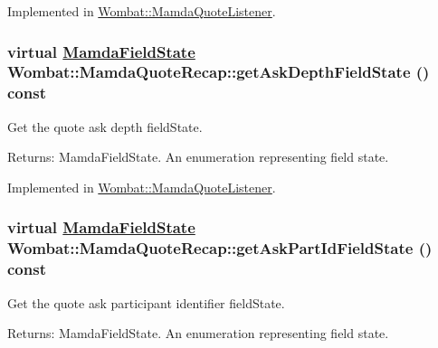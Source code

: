 Implemented in \hyperlink{classWombat_1_1MamdaQuoteListener_4e3d063324f15dacfaf2eec0f7f31e71}{Wombat::Mamda\-Quote\-Listener}.\hypertarget{classWombat_1_1MamdaQuoteRecap_53dd0bc6a2a9ceb6612b2438cc2e9272}{
\subsubsection[getAskDepthFieldState]{\setlength{\rightskip}{0pt plus 5cm}virtual \hyperlink{namespaceWombat_93aac974f2ab713554fd12a1fa3b7d2a}{Mamda\-Field\-State} Wombat::Mamda\-Quote\-Recap::get\-Ask\-Depth\-Field\-State () const}}
\label{classWombat_1_1MamdaQuoteRecap_53dd0bc6a2a9ceb6612b2438cc2e9272}


Get the quote ask depth field\-State. 

\begin{Desc}
\item[Returns:]Mamda\-Field\-State. An enumeration representing field state. \end{Desc}


Implemented in \hyperlink{classWombat_1_1MamdaQuoteListener_f43a394a5e090162a80b749f682ecc38}{Wombat::Mamda\-Quote\-Listener}.\hypertarget{classWombat_1_1MamdaQuoteRecap_3e92b5b825c4ca2701857aee43c1e1e7}{
\subsubsection[getAskPartIdFieldState]{\setlength{\rightskip}{0pt plus 5cm}virtual \hyperlink{namespaceWombat_93aac974f2ab713554fd12a1fa3b7d2a}{Mamda\-Field\-State} Wombat::Mamda\-Quote\-Recap::get\-Ask\-Part\-Id\-Field\-State () const}}
\label{classWombat_1_1MamdaQuoteRecap_3e92b5b825c4ca2701857aee43c1e1e7}


Get the quote ask participant identifier field\-State. 

\begin{Desc}
\item[Returns:]Mamda\-Field\-State. An enumeration representing field state. \end{Desc}



